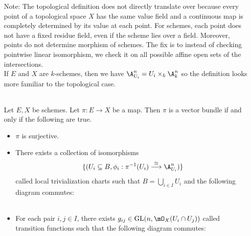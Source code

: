 \documentclass[a4paper]{article}
\begin{document}
Note: The topological definition does not directly translate over because every point of a topological space $X$ has the same value field and a continuous map is completely determined by its value at each point. For schemes, each point does not have a fixed residue field, even if the scheme lies over a field. Moreover, points do not determine morphism of schemes. The fix is to instead of checking pointwise linear isomorphism, we check it on all possible affine open sets of the intersections. \\

If $E$ and $X$ are $k$-schemes, then we have $\A_{U_i}^n=U_i\times_k\A_k^n$ so the definition looks more familiar to the topological case. 

\begin{prp}{}{}\\
Let $E,X$ be schemes. Let $\pi:E\to X$ be a map. Then $\pi$ is a vector bundle if and only if the following are true. 
\begin{itemize}
\item $\pi$ is surjective. 
\item There exists a collection of isomorphisms $$\{(U_i\subseteq B,\phi_i:\pi^{-1}(U_i)\overset{\cong}{\longrightarrow} \A_{U_i}^n)\}$$ called local trivialization charts such that $B=\bigcup_{i\in I}U_i$ and the following diagram commutes: \\
\\
\item For each pair $i,j\in I$, there exists $g_{ij}\in\text{GL}(n,\mO_X(U_i\cap U_j))$ called transition functions such that the following diagram commutes: \\
\\
\end{itemize}
\end{prp}
\end{document}

